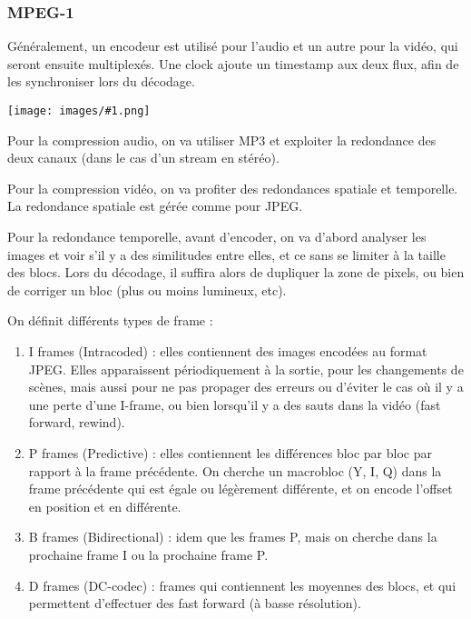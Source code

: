 \documentclass[10pt,a4paper]{report}
\newcommand{\dessin}[1]{\begin{center}\texttt{[image: images/\#1.png]}\end{center}}
\begin{document}
			\subsubsection{MPEG-1}
			Généralement, un encodeur est utilisé pour l'audio et un autre pour la vidéo, qui seront ensuite multiplexés. Une clock ajoute un timestamp aux deux flux, afin de les synchroniser lors du décodage.
		
			\dessin{71}
		
			Pour la compression audio, on va utiliser MP3 et exploiter la redondance des deux canaux (dans le cas d'un stream en stéréo).
		
			Pour la compression vidéo, on va profiter des redondances spatiale et temporelle. La redondance spatiale est gérée comme pour JPEG.
		
			Pour la redondance temporelle, avant d'encoder, on va d'abord analyser les images et voir s'il y a des similitudes entre elles, et ce sans se limiter à la taille des blocs. Lors du décodage, il suffira alors de dupliquer la zone de pixels, ou bien de corriger un bloc (plus ou moins lumineux, etc).
		
			On définit différents types de frame :%
		
			\begin{enumerate}
				\item I frames (Intracoded) : elles contiennent des images encodées au format JPEG. Elles apparaissent périodiquement à la sortie, pour les changements de scènes, mais aussi pour ne pas propager des erreurs ou d'éviter le cas où il y a une perte d'une I-frame, ou bien lorsqu'il y a des sauts dans la vidéo (fast forward, rewind).
			
				\item P frames (Predictive) : elles contiennent les différences bloc par bloc par rapport à la frame précédente. On cherche un macrobloc (Y, I, Q) dans la frame précédente qui est égale ou légèrement différente, et on encode l'offset en position et en différente.
			
				\item B frames (Bidirectional) : idem que les frames P, mais on cherche dans la prochaine frame I ou la prochaine frame P.
			
				\item D frames (DC-codec) : frames qui contiennent les moyennes des blocs, et qui permettent d'effectuer des fast forward (à basse résolution).
			\end{enumerate}	
			
\end{document}
